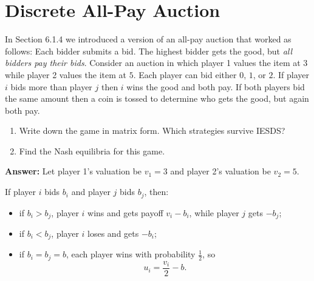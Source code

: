 \documentclass[12pt,a4paper]{article}
\begin{document}
\section{Discrete All-Pay Auction}
In Section 6.1.4 we introduced a version of an all-pay auction that worked as follows: Each bidder submits a bid. The highest bidder gets the good, but \emph{all bidders pay their bids}. Consider an auction in which player 1 values the item at \(3\) while player 2 values the item at \(5\). Each player can bid either \(0\), \(1\), or \(2\). If player \(i\) bids more than player \(j\) then \(i\) wins the good and both pay. If both players bid the same amount then a coin is tossed to determine who gets the good, but again both pay.

\begin{enumerate}[label=\alph*.]
  \item Write down the game in matrix form. Which strategies survive IESDS?
  \item Find the Nash equilibria for this game.
\end{enumerate}

\vspace{0.5cm}
\noindent\textbf{Answer: }Let player 1's valuation be \(v_1=3\) and player 2's valuation be \(v_2=5\).  

If player \(i\) bids \(b_i\) and player \(j\) bids \(b_j\), then:
\begin{itemize}
  \item if \(b_i>b_j\), player \(i\) wins and gets payoff \(v_i-b_i\), while player \(j\) gets \(-b_j\);
  \item if \(b_i<b_j\), player \(i\) loses and gets \(-b_i\);
  \item if \(b_i=b_j=b\), each player wins with probability \(\frac12\), so
  \[
  u_i=\frac{v_i}{2}-b.
  \]
\end{itemize}
\end{document}
